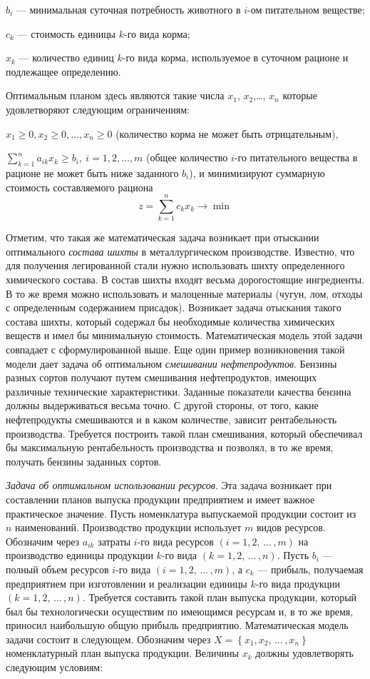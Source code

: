 $b_i$ — минимальная суточная потребность животного в $i$-ом питательном веществе;

$c_k$  — стоимость единицы $k$-го вида корма;

$x_k$  — количество единиц $k$-го вида корма, используемое в суточном рационе и подлежащее определению.

Оптимальным планом здесь являются такие числа $x_1$, $x_2$,\ldots, $x_n$ которые удовлетворяют следующим ограничениям:

\(x_1 \geq 0 , x_2 \geq 0 , \dots , x_n \geq 0 \) (количество корма не может быть отрицательным),

\(\sum\limits_{k=1}^n a_{ik} x_k \geq b_i ,\: i=1,2, \dots, m\) (общее количество $i$-го питательного вещества в рационе не может быть ниже заданного $b_i$), и минимизируют суммарную стоимость составляемого рациона
$$
z=\sum\limits_{k=1}^n c_k x_k \rightarrow \min
$$

Отметим, что такая же математическая задача возникает при отыскании оптимального \textit{состава шихты} в металлургическом производстве. Известно, что для получения легированной стали нужно использовать шихту определенного химического состава. В состав шихты входят весьма дорогостоящие ингредиенты. В то же время можно использовать и малоценные материалы (чугун, лом, отходы с определенным содержанием присадок). Возникает задача отыскания такого состава шихты, который содержал бы необходимые количества химических веществ и имел бы минимальную стоимость. Математическая модель этой задачи совпадает с сформулированной выше. Еще один пример возникновения такой модели дает задача об оптимальном \textit{смешивании нефтепродуктов}. Бензины разных сортов получают путем смешивания нефтепродуктов, имеющих различные технические характеристики. Заданные показатели качества бензина должны выдерживаться весьма точно. С другой стороны, от того, какие нефтепродукты смешиваются и в каком количестве, зависит рентабельность производства. Требуется построить такой план смешивания, который обеспечивал бы максимальную рентабельность производства и позволял, в то же время, получать бензины заданных сортов.

\textit{Задача об оптимальном использовании ресурсов}. Эта задача возникает при составлении планов выпуска продукции предприятием и имеет важное практическое значение. Пусть номенклатура выпускаемой продукции состоит из $n$ наименований. Производство продукции использует $m$ видов ресурсов. Обозначим через $a_{ik}$ затраты $i$-го вида ресурсов $(i= 1, 2,\, \dots\, , m)$ на производство единицы продукции $k$-го вида $(k = 1, 2,\, \dots\, , n)$. Пусть $b_i$ — полный объем ресурсов $i$-го вида $(i = 1, 2,\, \dots\, , m)$, а $c_k$  — прибыль, получаемая предприятием при изготовлении и реализации единицы $k$-го вида продукции $(k = 1, 2,\, \dots\, , n)$. Требуется составить такой план выпуска продукции, который был бы технологически осуществим по имеющимся ресурсам и, в то же время, приносил наибольшую общую прибыль предприятию. Математическая модель задачи состоит в следующем. Обозначим  через \(X = \left\{ x_1, x_2,\, \dots \, , x_n \right\}\) номенклатурный план выпуска продукции. Величины $x_k$ должны удовлетворять следующим условиям:

